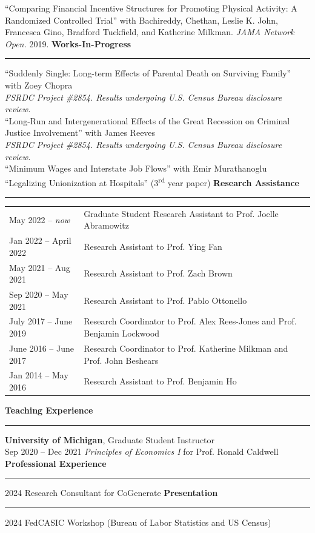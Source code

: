 \documentclass[12pt,letterpaper]{article}
\newcommand{\cvheading}[1]{%
    \vspace{0.5cm}
    {\Large \textbf{#1}}
    \vspace{0.1cm}
    \hrule
    \vspace{0.2cm}
}
\begin{document}
``Comparing Financial Incentive Structures for Promoting Physical Activity: A Randomized Controlled Trial'' with Bachireddy, Chethan, Leslie K. John, Francesca Gino, Bradford Tuckfield, and Katherine Milkman. \textit{JAMA Network Open.} 2019.
\cvheading{Works-In-Progress}
``Suddenly Single: Long-term Effects of Parental Death on Surviving Family'' with Zoey Chopra \\
\textit{FSRDC Project \#2854. Results undergoing U.S. Census Bureau disclosure review.}
\\[0.2cm]
``Long-Run and Intergenerational Effects of the Great Recession on Criminal Justice Involvement'' with James Reeves \\
\textit{FSRDC Project \#2854. Results undergoing U.S. Census Bureau disclosure review.}
\\[0.2cm]
``Minimum Wages and Interstate Job Flows'' with Emir Murathanoglu
\\[0.2cm]
``Legalizing Unionization at Hospitals'' (3\textsuperscript{rd} year paper)
\newpage
\cvheading{Research Assistance}
\begin{tabular}{l l}
May 2022 -- \textit{now} & Graduate Student Research Assistant to Prof. Joelle Abramowitz \\
Jan 2022 -- April 2022 & Research Assistant to Prof. Ying Fan \\
May 2021 -- Aug 2021 & Research Assistant to Prof. Zach Brown \\
Sep 2020 -- May 2021 & Research Assistant to Prof. Pablo Ottonello \\
July 2017 -- June 2019 & Research Coordinator to Prof. Alex Rees-Jones and Prof. Benjamin Lockwood \\
June 2016 -- June 2017 & Research Coordinator to Prof. Katherine Milkman and Prof. John Beshears \\
Jan 2014 -- May 2016 & Research Assistant to Prof. Benjamin Ho\\
\end{tabular}
\cvheading{Teaching Experience}
\textbf{University of Michigan}, Graduate Student Instructor \\
Sep 2020 -- Dec 2021 \hspace{0.5cm} \textit{Principles of Economics I} for Prof. Ronald Caldwell
\cvheading{Professional Experience}
2024 \hspace{0.5cm} Research Consultant for CoGenerate
\cvheading{Presentation}
2024 \hspace{0.5cm} FedCASIC Workshop (Bureau of Labor Statistics and US Census)
\end{document}
